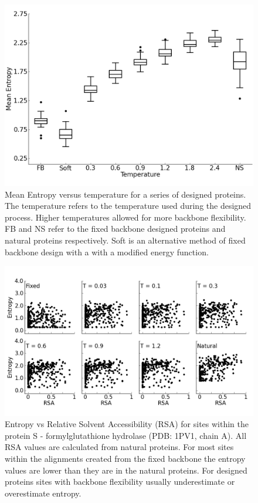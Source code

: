 \documentclass[12pt]{article}
\begin{document}
\begin{figure}[H]
\centerline{\includegraphics[width = 6in]{figures/Mean_Entropy_vs_Temp_Boxplot_Noah.png}}
\caption{Mean Entropy versus temperature for a series of designed proteins. The temperature refers to the temperature used during the designed process. Higher temperatures allowed for more backbone flexibility. FB and NS refer to the fixed backbone designed proteins and natural proteins respectively. Soft is an alternative method of fixed backbone design with a with a modified energy function.}
\label{NoahSiteVarFig1}
\end{figure}

\begin{figure}[H]
\centering
\centerline{\includegraphics[width = 6.5in]{figures/RSA_vs_Entropy_1PV1_Combination_Plot.png}}
\caption{Entropy vs Relative Solvent Accessibility (RSA) for sites within the protein S - formylglutathione hydrolase (PDB: 1PV1, chain A). All RSA values are calculated from natural proteins. For most sites within the alignments created from the fixed backbone the entropy values are lower than they are in the natural proteins.  For designed proteins sites with backbone flexibility usually underestimate or overestimate entropy.}
\label{SiteVarFig2}
\end{figure}
\end{document}
